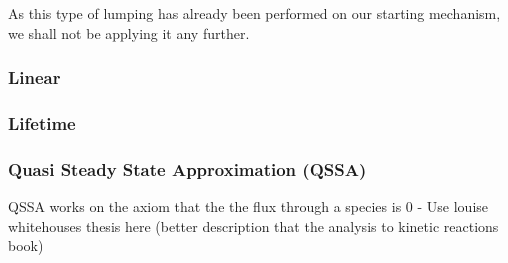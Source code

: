 As this type of lumping has already been performed on our starting mechanism, we shall not be applying it any further. 


\subsubsection{Linear}
\subsubsection{Lifetime}
\subsubsection{Quasi Steady State Approximation (QSSA)}
QSSA works on the axiom that the the flux through a species is 0  - Use louise whitehouses thesis here (better description that the analysis to kinetic reactions book)
